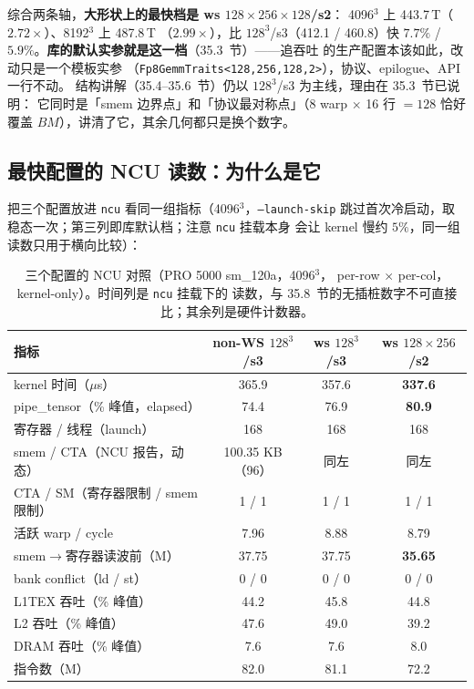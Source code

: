 综合两条轴，\textbf{大形状上的最快档是 ws $128\times256\times128$/s2}：
4096$^3$ 上 443.7\,T（$2.72\times$）、8192$^3$ 上 487.8\,T
（$2.99\times$），比 $128^3$/s3（412.1 / 460.8）快
$7.7\%$ / $5.9\%$。\textbf{库的默认实参就是这一档}（35.3~节）——追吞吐
的生产配置本该如此，改动只是一个模板实参
（\texttt{Fp8GemmTraits<128,256,128,2>}），协议、epilogue、API 一行不动。
结构讲解（35.4--35.6~节）仍以 $128^3$/s3 为主线，理由在 35.3~节已说明：
它同时是「smem 边界点」和「协议最对称点」（8 warp $\times$ 16 行 $=128$
恰好覆盖 $BM$），讲清了它，其余几何都只是换个数字。

\subsection{最快配置的 NCU 读数：为什么是它}\label{sec:35-ncu}

把三个配置放进 \texttt{ncu} 看同一组指标（4096$^3$，\texttt{--launch-skip}
跳过首次冷启动，取稳态一次；第三列即库默认档；注意 \texttt{ncu} 挂载本身
会让 kernel 慢约
$5\%$，同一组读数只用于横向比较）：

\begin{table}[H]
\centering
\scriptsize
\begin{tabular}{lccc}
\toprule
指标 & non-WS $128^3$/s3 & ws $128^3$/s3 & ws $128\times256$/s2 \\
\midrule
kernel 时间（$\mu$s）            & 365.9 & 357.6 & \textbf{337.6} \\
pipe\_tensor（\% 峰值，elapsed） & 74.4  & 76.9  & \textbf{80.9} \\
寄存器 / 线程（launch）          & 168   & 168   & 168 \\
smem / CTA（NCU 报告，动态）    & 100.35 KB（96）& 同左 & 同左 \\
CTA / SM（寄存器限制 / smem 限制）& 1 / 1 & 1 / 1 & 1 / 1 \\
活跃 warp / cycle                & 7.96  & 8.88  & 8.79 \\
smem$\to$寄存器读波前（M）       & 37.75 & 37.75 & \textbf{35.65} \\
bank conflict（ld / st）         & 0 / 0 & 0 / 0 & 0 / 0 \\
L1TEX 吞吐（\% 峰值）            & 44.2  & 45.8  & 44.8 \\
L2 吞吐（\% 峰值）               & 47.6  & 49.0  & 39.2 \\
DRAM 吞吐（\% 峰值）             & 7.6   & 7.6   & 8.0 \\
指令数（M）                      & 82.0  & 81.1  & 72.2 \\
\bottomrule
\end{tabular}
\caption{三个配置的 NCU 对照（PRO 5000 sm\_120a，4096$^3$，
per-row $\times$ per-col，kernel-only）。时间列是 \texttt{ncu} 挂载下的
读数，与 35.8~节的无插桩数字不可直接比；其余列是硬件计数器。}
\label{tab:35-ncu}
\end{table}

